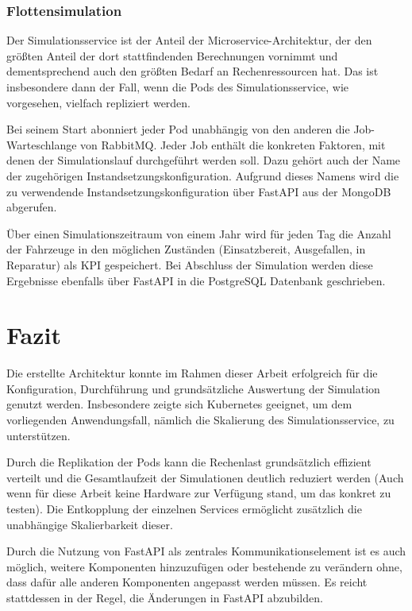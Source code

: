 \documentclass[11pt,a4paper]{article}
\begin{document}
\subsubsection{Flottensimulation}
\label{sec:Flottensimulation}
Der Simulationsservice ist der Anteil der Microservice-Architektur, der den größten Anteil
der dort stattfindenden Berechnungen vornimmt und dementsprechend auch den größten Bedarf
an Rechenressourcen hat. Das ist insbesondere dann der Fall, wenn die Pods des Simulationsservice,
wie vorgesehen, vielfach repliziert werden.

Bei seinem Start abonniert jeder Pod unabhängig von den anderen die Job-Warteschlange von RabbitMQ.
Jeder Job enthält die konkreten Faktoren, mit denen der Simulationslauf durchgeführt werden soll.
Dazu gehört auch der Name der zugehörigen Instandsetzungskonfiguration. Aufgrund
dieses Namens wird die zu verwendende Instandsetzungskonfiguration über FastAPI
aus der MongoDB abgerufen.

Über einen Simulationszeitraum von einem Jahr wird für jeden Tag die Anzahl der Fahrzeuge
in den möglichen Zuständen (Einsatzbereit, Ausgefallen, in Reparatur) als KPI gespeichert.
Bei Abschluss der Simulation werden diese Ergebnisse ebenfalls über FastAPI in die 
PostgreSQL Datenbank geschrieben.

\section{Fazit}
Die erstellte Architektur konnte im Rahmen dieser Arbeit erfolgreich für die Konfiguration, Durchführung und grundsätzliche
Auswertung der Simulation genutzt werden. 
Insbesondere zeigte sich Kubernetes geeignet, um dem vorliegenden Anwendungsfall, nämlich die Skalierung des Simulationsservice,
zu unterstützen. 

Durch die Replikation der Pods kann die Rechenlast grundsätzlich effizient verteilt und 
die Gesamtlaufzeit der Simulationen deutlich reduziert werden 
(Auch wenn für diese Arbeit keine Hardware zur Verfügung stand, um das konkret zu testen).
Die Entkopplung der einzelnen Services ermöglicht zusätzlich die unabhängige Skalierbarkeit dieser.

Durch die Nutzung von FastAPI als zentrales Kommunikationselement ist es auch möglich, weitere Komponenten hinzuzufügen
oder bestehende zu verändern ohne, dass dafür alle anderen Komponenten angepasst werden müssen.
Es reicht stattdessen in der Regel, die Änderungen in FastAPI abzubilden.
\end{document}
